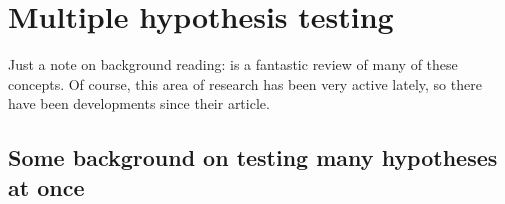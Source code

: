 

\section{Multiple hypothesis testing}

Just a note on background reading: \citet{RSW08} is a fantastic review
of many of these concepts. Of course, this area of research has been
very active lately, so there have been developments since their
article.

  \subsection{Some background on testing many hypotheses at once}

